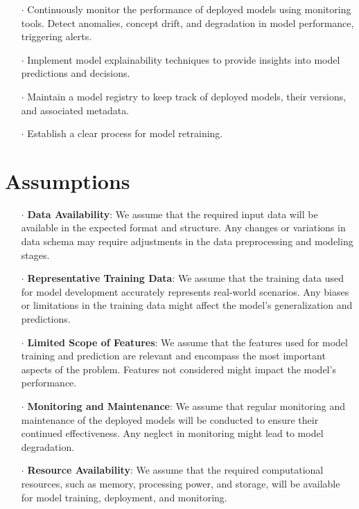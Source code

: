 \documentclass{report}
\begin{document}
\begin{itemize}
    \item[$\cdot$] Continuously monitor the performance of deployed models using monitoring tools. Detect anomalies, concept drift, and degradation in model performance, triggering alerts.
    \item[$\cdot$] Implement model explainability techniques to provide insights into model predictions and decisions.
    \item[$\cdot$] Maintain a model registry to keep track of deployed models, their versions, and associated metadata.
    \item[$\cdot$] Establish a clear process for model retraining.
\end{itemize}

\section{Assumptions}

\begin{itemize}
    \item[$\cdot$] \textbf{Data Availability}: We assume that the required input data will be available in the expected format and structure. Any changes or variations in data schema may require adjustments in the data preprocessing and modeling stages.
    \item[$\cdot$] \textbf{Representative Training Data}: We assume that the training data used for model development accurately represents real-world scenarios. Any biases or limitations in the training data might affect the model's generalization and predictions.
    \item[$\cdot$] \textbf{Limited Scope of Features}: We assume that the features used for model training and prediction are relevant and encompass the most important aspects of the problem. Features not considered might impact the model's performance.
    \item[$\cdot$] \textbf{Monitoring and Maintenance}: We assume that regular monitoring and maintenance of the deployed models will be conducted to ensure their continued effectiveness. Any neglect in monitoring might lead to model degradation.
    \item[$\cdot$] \textbf{Resource Availability}: We assume that the required computational resources, such as memory, processing power, and storage, will be available for model training, deployment, and monitoring.
\end{itemize}
\end{document}
